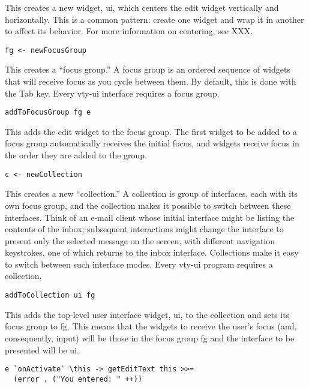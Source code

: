 This creates a new widget, ui, which centers the edit widget vertically
and horizontally.  This is a common pattern: create one widget and wrap
it in another to affect its behavior.  For more information on
centering, see XXX.

\begin{verbatim}
fg <- newFocusGroup
\end{verbatim}

This creates a “focus group.”  A focus group is an ordered sequence of
widgets that will receive focus as you cycle between them.  By default,
this is done with the Tab key.  Every vty-ui interface requires a focus
group.

\begin{verbatim}
addToFocusGroup fg e
\end{verbatim}

This adds the edit widget to the focus group.  The first widget to be
added to a focus group automatically receives the initial focus, and
widgets receive focus in the order they are added to the group.

\begin{verbatim}
c <- newCollection
\end{verbatim}

This creates a new “collection.”  A collection is group of interfaces,
each with its own focus group, and the collection makes it possible to
switch between these interfaces.  Think of an e-mail client whose
initial interface might be listing the contents of the inbox; subsequent
interactions might change the interface to present only the selected
message on the screen, with different navigation keystrokes, one of
which returns to the inbox interface.  Collections make it easy to
switch between such interface modes.  Every vty-ui program requires a
collection.

\begin{verbatim}
addToCollection ui fg
\end{verbatim}

This adds the top-level user interface widget, ui, to the collection and
sets its focus group to fg.  This means that the widgets to receive the
user’s focus (and, consequently, input) will be those in the focus group
fg and the interface to be presented will be ui.

\begin{verbatim}
e `onActivate` \this -> getEditText this >>=
  (error . ("You entered: " ++))
\end{verbatim}

